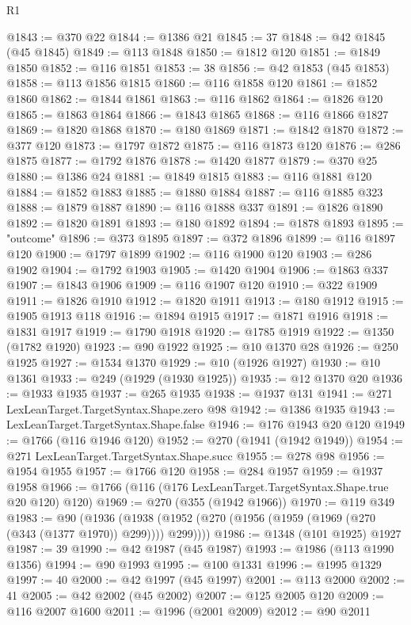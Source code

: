 \begin{lexlean}{R1}
\begin{coremodule}
@1843 := @370 @22
@1844 := @1386 @21
@1845 := 37
@1848 := @42 @1845 (@45 @1845)
@1849 := @113 @1848
@1850 := @1812 @120
@1851 := @1849 @1850
@1852 := @116 @1851
@1853 := 38
@1856 := @42 @1853 (@45 @1853)
@1858 := @113 @1856 @1815
@1860 := @116 @1858 @120
@1861 := @1852 @1860
@1862 := @1844 @1861
@1863 := @116 @1862
@1864 := @1826 @120
@1865 := @1863 @1864
@1866 := @1843 @1865
@1868 := @116 @1866 @1827
@1869 := @1820 @1868
@1870 := @180 @1869
@1871 := @1842 @1870
@1872 := @377 @120
@1873 := @1797 @1872
@1875 := @116 @1873 @120
@1876 := @286 @1875
@1877 := @1792 @1876
@1878 := @1420 @1877
@1879 := @370 @25
@1880 := @1386 @24
@1881 := @1849 @1815
@1883 := @116 @1881 @120
@1884 := @1852 @1883
@1885 := @1880 @1884
@1887 := @116 @1885 @323
@1888 := @1879 @1887
@1890 := @116 @1888 @337
@1891 := @1826 @1890
@1892 := @1820 @1891
@1893 := @180 @1892
@1894 := @1878 @1893
@1895 := "outcome"
@1896 := @373 @1895
@1897 := @372 @1896
@1899 := @116 @1897 @120
@1900 := @1797 @1899
@1902 := @116 @1900 @120
@1903 := @286 @1902
@1904 := @1792 @1903
@1905 := @1420 @1904
@1906 := @1863 @337
@1907 := @1843 @1906
@1909 := @116 @1907 @120
@1910 := @322 @1909
@1911 := @1826 @1910
@1912 := @1820 @1911
@1913 := @180 @1912
@1915 := @1905 @1913 @118
@1916 := @1894 @1915
@1917 := @1871 @1916
@1918 := @1831 @1917
@1919 := @1790 @1918
@1920 := @1785 @1919
@1922 := @1350 (@1782 @1920)
@1923 := @90 @1922
@1925 := @10 @1370 @28
@1926 := @250 @1925
@1927 := @1534 @1370
@1929 := @10 (@1926 @1927)
@1930 := @10 @1361
@1933 := @249 (@1929 (@1930 @1925))
@1935 := @12 @1370 @20
@1936 := @1933 @1935
@1937 := @265 @1935
@1938 := @1937 @131
@1941 := @271 LexLeanTarget.TargetSyntax.Shape.zero @98
@1942 := @1386 @1935
@1943 := LexLeanTarget.TargetSyntax.Shape.false
@1946 := @176 @1943 @20 @120
@1949 := @1766 (@116 @1946 @120)
@1952 := @270 (@1941 (@1942 @1949))
@1954 := @271 LexLeanTarget.TargetSyntax.Shape.succ
@1955 := @278 @98
@1956 := @1954 @1955
@1957 := @1766 @120
@1958 := @284 @1957
@1959 := @1937 @1958
@1966 := @1766 (@116 (@176 LexLeanTarget.TargetSyntax.Shape.true @20 @120) @120)
@1969 := @270 (@355 (@1942 @1966))
@1970 := @119 @349
@1983 := @90
    (@1936 (@1938 (@1952 (@270 (@1956 (@1959 (@1969 (@270 (@343 (@1377 @1970)) @299)))) @299))))
@1986 := @1348 (@101 @1925) @1927
@1987 := 39
@1990 := @42 @1987 (@45 @1987)
@1993 := @1986 (@113 @1990 @1356)
@1994 := @90 @1993
@1995 := @100 @1331
@1996 := @1995 @1329
@1997 := 40
@2000 := @42 @1997 (@45 @1997)
@2001 := @113 @2000
@2002 := 41
@2005 := @42 @2002 (@45 @2002)
@2007 := @125 @2005 @120
@2009 := @116 @2007 @1600
@2011 := @1996 (@2001 @2009)
@2012 := @90 @2011

\end{coremodule}
\end{lexlean}
